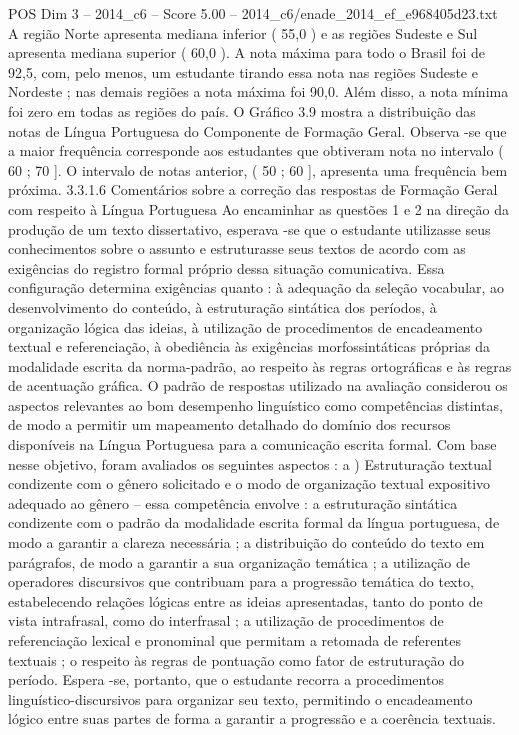 \begin{textsample}{POS Dim 3 – 2014\_c6 – Score 5.00 – 2014\_c6/enade\_2014\_ef\_e968405d23.txt}
A região Norte apresenta mediana inferior ( 55,0 ) e as regiões Sudeste e Sul apresenta mediana superior ( 60,0 ).
A nota máxima para todo o Brasil foi de 92,5, com, pelo menos, um estudante tirando essa nota nas regiões Sudeste e Nordeste ; nas demais regiões a nota máxima foi 90,0.
Além disso, a nota mínima foi zero em todas as regiões do país.
O Gráfico 3.9 mostra a distribuição das notas de Língua Portuguesa do Componente de Formação Geral.
Observa -se que a maior frequência corresponde aos estudantes que obtiveram nota no intervalo ( 60 ; 70 ].
O intervalo de notas anterior, ( 50 ; 60 ], apresenta uma frequência bem próxima. 3.3.1.6 Comentários sobre a correção das respostas de Formação Geral com respeito à Língua Portuguesa Ao encaminhar as questões 1 e 2 na direção da produção de um texto dissertativo, esperava -se que o estudante utilizasse seus conhecimentos sobre o assunto e estruturasse seus textos de acordo com as exigências do registro formal próprio dessa situação comunicativa.
Essa configuração determina exigências quanto : à adequação da seleção vocabular, ao desenvolvimento do conteúdo, à estruturação sintática dos períodos, à organização lógica das ideias, à utilização de procedimentos de encadeamento textual e referenciação, à obediência às exigências morfossintáticas próprias da modalidade escrita da norma-padrão, ao respeito às regras ortográficas e às regras de acentuação gráfica.
O padrão de respostas utilizado na avaliação considerou os aspectos relevantes ao bom desempenho linguístico como competências distintas, de modo a permitir um mapeamento detalhado do domínio dos recursos disponíveis na Língua Portuguesa para a comunicação escrita formal.
Com base nesse objetivo, foram avaliados os seguintes aspectos : a ) Estruturação textual condizente com o gênero solicitado e o modo de organização textual expositivo adequado ao gênero – essa competência envolve : a estruturação sintática condizente com o padrão da modalidade escrita formal da língua portuguesa, de modo a garantir a clareza necessária ; a distribuição do conteúdo do texto em parágrafos, de modo a garantir a sua organização temática ; a utilização de operadores discursivos que contribuam para a progressão temática do texto, estabelecendo relações lógicas entre as ideias apresentadas, tanto do ponto de vista intrafrasal, como do interfrasal ; a utilização de procedimentos de referenciação lexical e pronominal que permitam a retomada de referentes textuais ; o respeito às regras de pontuação como fator de estruturação do período.
Espera -se, portanto, que o estudante recorra a procedimentos linguístico-discursivos para organizar seu texto, permitindo o encadeamento lógico entre suas partes de forma a garantir a progressão e a coerência textuais.

\end{textsample}
